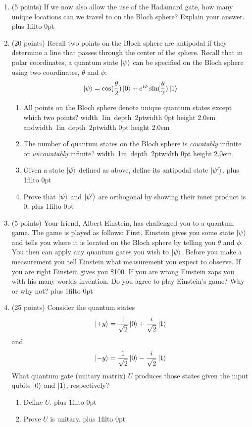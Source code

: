 \documentclass[12pt]{article}
\newcommand{\Blank}{\mbox{\hskip 4pt\vrule width 1in depth 2pt}\vrule width 0pt height 2.0em}
\def\DefaultSpace{1in}
\newcommand{\LeaveSpace}[1][\DefaultSpace]{%
\vskip #1 plus 1fil\relax\hbox to 0pt{\hss} %
}
\begin{document}
\begin{enumerate}[font=\bfseries]
    \item (5 points) If we now also allow the use of the Hadamard gate, how many unique locations can we travel to on the Bloch sphere? Explain your answer. \LeaveSpace{}
    \item (20 points) Recall two points on the Bloch sphere are antipodal if they determine a line that passes through the center of the sphere. Recall that in polar coordinates, a quantum state $\ket{\psi}$ can be specified on the Bloch sphere using two coordinates, $\theta$ and $\phi$:
    \[\ket{\psi} = \cos(\frac{\theta}{2})\ket{0}
    + e^{i\phi}\sin(\frac{\theta}{2})\ket{1}\]
    \begin{enumerate}
        \item All points on the Bloch sphere denote unique quantum states except which two points? \Blank{} and\Blank{}
        \item The number of quantum states on the Bloch sphere is \emph{countably} infinite or \emph{uncountably} infinite? \Blank{}
        \item Given a state $\ket{\psi}$ defined as above, define its antipodal state $\ket{\psi'}$. \LeaveSpace{}
        \item Prove that $\ket{\psi}$ and $\ket{\psi'}$ are orthogonal by showing their inner product is 0. \LeaveSpace[2.0in]
    \end{enumerate}
    \item (5 points) Your friend, Albert Einstein, has challenged you to a quantum game. The game is played as follows: First, Einstein gives you some state $\ket{\psi}$ and tells you where it is located on the Bloch sphere by telling you $\theta$ and $\phi$. You then can apply any quantum gates you wish to $\ket{\psi}$. Before you make a measurement you tell Einstein what measurement you expect to observe. If you are right Einstein gives you \$100. If you are wrong Einstein zaps you with his many-worlds invention. Do you agree to play Einstein's game? Why or why not? \LeaveSpace{}
    \item (25 points) Consider the quantum states
        \[\ket{+y} = \frac{1}{\sqrt{2}}\ket{0} + \frac{i}{\sqrt{2}}\ket{1}\]
        and
        \[\ket{-y} = \frac{1}{\sqrt{2}}\ket{0} - \frac{i}{\sqrt{2}}\ket{1}\]
        What quantum gate (unitary matrix) $U$ produces those states given the input qubits $\ket{0}$ and $\ket{1}$, respectively?
        \begin{enumerate}
            \item Define $U$. \LeaveSpace[0.75in]
            \item Prove $U$ is unitary. \LeaveSpace[2.5in]

\end{enumerate}
\end{enumerate}
\end{document}
